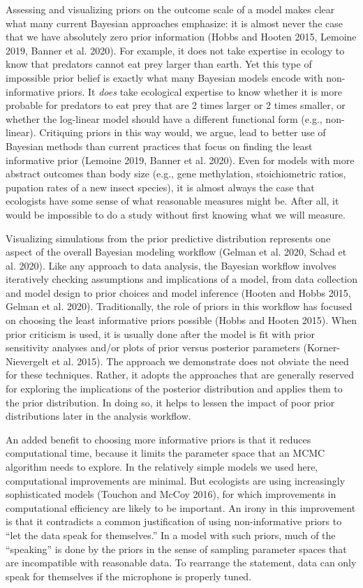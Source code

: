 \documentclass[
  12pt,
]{article}
\begin{document}
Assessing and visualizing priors on the outcome scale of a model makes
clear what many current Bayesian approaches emphasize: it is almost
never the case that we have absolutely zero prior information (Hobbs and
Hooten 2015, Lemoine 2019, Banner et al. 2020). For example, it does not
take expertise in ecology to know that predators cannot eat prey larger
than earth. Yet this type of impossible prior belief is exactly what
many Bayesian models encode with non-informative priors. It \emph{does}
take ecological expertise to know whether it is more probable for
predators to eat prey that are 2 times larger or 2 times smaller, or
whether the log-linear model should have a different functional form
(e.g., non-linear). Critiquing priors in this way would, we argue, lead
to better use of Bayesian methods than current practices that focus on
finding the least informative prior (Lemoine 2019, Banner et al. 2020).
Even for models with more abstract outcomes than body size (e.g., gene
methylation, stoichiometric ratios, pupation rates of a new insect
species), it is almost always the case that ecologists have some sense
of what reasonable measures might be. After all, it would be impossible
to do a study without first knowing what we will measure.

Visualizing simulations from the prior predictive distribution
represents one aspect of the overall Bayesian modeling workflow (Gelman
et al. 2020, Schad et al. 2020). Like any approach to data analysis, the
Bayesian workflow involves iteratively checking assumptions and
implications of a model, from data collection and model design to prior
choices and model inference (Hooten and Hobbs 2015, Gelman et al. 2020).
Traditionally, the role of priors in this workflow has focused on
choosing the least informative priors possible (Hobbs and Hooten 2015).
When prior criticism is used, it is usually done after the model is fit
with prior sensitivity analyses and/or plots of prior versus posterior
parameters (Korner-Nievergelt et al. 2015). The approach we demonstrate
does not obviate the need for these techniques. Rather, it adopts the
approaches that are generally reserved for exploring the implications of
the posterior distribution and applies them to the prior distribution.
In doing so, it helps to lessen the impact of poor prior distributions
later in the analysis workflow.

An added benefit to choosing more informative priors is that it reduces
computational time, because it limits the parameter space that an MCMC
algorithm needs to explore. In the relatively simple models we used
here, computational improvements are minimal. But ecologists are using
increasingly sophisticated models (Touchon and McCoy 2016), for which
improvements in computational efficiency are likely to be important. An
irony in this improvement is that it contradicts a common justification
of using non-informative priors to ``let the data speak for
themselves.'' In a model with such priors, much of the ``speaking'' is
done by the priors in the sense of sampling parameter spaces that are
incompatible with reasonable data. To rearrange the statement, data can
only speak for themselves if the microphone is properly tuned.
\end{document}
